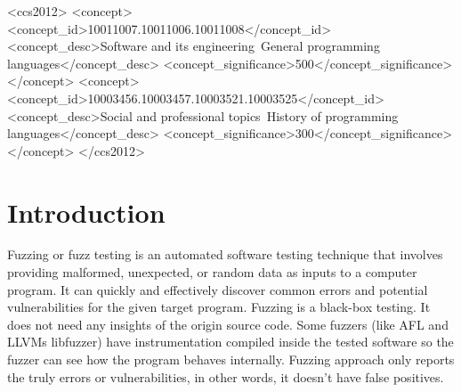 \documentclass[sigplan,10pt,review = false]{acmart}\settopmatter{printfolios=true,printccs=false,printacmref=false}
\begin{document}
\begin{CCSXML}
<ccs2012>
<concept>
<concept_id>10011007.10011006.10011008</concept_id>
<concept_desc>Software and its engineering~General programming languages</concept_desc>
<concept_significance>500</concept_significance>
</concept>
<concept>
<concept_id>10003456.10003457.10003521.10003525</concept_id>
<concept_desc>Social and professional topics~History of programming languages</concept_desc>
<concept_significance>300</concept_significance>
</concept>
</ccs2012>
\end{CCSXML}





\maketitle


\section{Introduction}

Fuzzing or fuzz testing is an automated software testing technique that involves providing malformed, unexpected, or random data as inputs to a computer program. It can quickly and effectively discover common errors and potential vulnerabilities for the given target program. Fuzzing is a black-box testing. It does not need any insights of the origin source code\cite{takanen2009fuzzing}. Some fuzzers (like AFL and LLVMs libfuzzer) have instrumentation compiled inside the tested software so the fuzzer can see how the program behaves internally. Fuzzing approach only reports the truly errors or vulnerabilities, in other words, it doesn't have false positives. 
\end{document}
